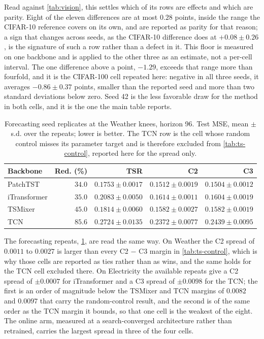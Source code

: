 \documentclass[10pt]{article}
\theoremstyle{paper}
\begin{document}
Read against \cref{tab:vision}, this settles which of its rows are effects and which are parity.
Eight of the eleven differences are at most $0.28$ points, inside the range the CIFAR-10 reference
covers on its own, and are reported as parity for that reason; a sign that changes across seeds, as the
CIFAR-10 difference does at $+0.08\pm0.26$, is the signature of such a row rather than a defect
in it. This floor is measured on one backbone and is applied to the other three as an estimate, not
a per-cell interval. The one difference above a point, $-1.29$, exceeds that range more than
fourfold, and it is the CIFAR-100 cell repeated here: negative in all three seeds, it averages
$-0.86\pm0.37$ points, smaller than the reported seed and more than two standard deviations below
zero. Seed 42 is the less favorable draw for the method in both cells, and it is the one the main
table reports.

\begin{table}[h]
\centering
\caption{Forecasting seed replicates at the Weather knees, horizon 96. Test MSE, mean $\pm$ s.d.
over the repeats; lower is better. The TCN row is the cell whose random control misses its
parameter target and is therefore excluded from \cref{tab:ts-control}, reported here for the
spread only.}
\label{tab:seed-ts}
\footnotesize
\setlength{\tabcolsep}{5.0pt}
\begin{tabular}{@{}lrrrr@{}}
\toprule
Backbone & Red. (\%) & TSR & C2 & C3 \\
\midrule
PatchTST     & $34.0$ & $0.1753\pm0.0017$ & $0.1512\pm0.0019$ & $0.1504\pm0.0012$ \\
iTransformer & $35.0$ & $0.2083\pm0.0050$ & $0.1614\pm0.0011$ & $0.1604\pm0.0019$ \\
TSMixer      & $45.0$ & $0.1814\pm0.0060$ & $0.1582\pm0.0027$ & $0.1582\pm0.0019$ \\
TCN          & $85.6$ & $0.2724\pm0.0135$ & $0.2372\pm0.0077$ & $0.2439\pm0.0095$ \\
\bottomrule
\end{tabular}
\end{table}

The forecasting repeats, \cref{tab:seed-ts}, are read the same way. On Weather the C2 spread of $0.0011$ to $0.0027$
is larger than every C2 $-$ C3 margin in \cref{tab:ts-control}, which is why those cells are
reported as ties rather than as wins, and the same holds for the TCN cell excluded there. On
Electricity the available repeats give a C2 spread of $\pm0.0007$ for iTransformer and a C3
spread of $\pm0.0098$ for the TCN; the first is an order of magnitude below the TSMixer and TCN
margins of $0.0082$ and $0.0097$ that carry the random-control result, and the second is of the
same order as the TCN margin it bounds, so that one cell is the weakest of the eight. The
online arm, measured at a search-converged architecture rather than retrained, carries the
largest spread in three of the four cells.
\end{document}
